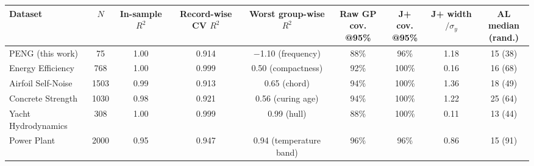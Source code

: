 \footnotesize\setlength{\tabcolsep}{2.5pt}%
\begin{tabular}{@{}lcccccccc@{}}
\toprule
Dataset & $N$ & \shortstack{In-sample\\$R^2$} & \shortstack{Record-wise\\CV $R^2$} & \shortstack{Worst group-wise\\$R^2$} & \shortstack{Raw GP cov.\\@95\%} & \shortstack{J+ cov.\\@95\%} & \shortstack{J+ width\\$/\sigma_y$} & \shortstack{AL median\\(rand.)} \\
\midrule
PENG (this work) & 75 & 1.00 & 0.914 & $-$1.10 (frequency) & 88\% & 96\% & 1.18 & 15 (38) \\
Energy Efficiency \cite{tsanasAccurateQuantitativeEstimation2012} & 768 & 1.00 & 0.999 & 0.50 (compactness) & 92\% & 100\% & 0.16 & 16 (68) \\
Airfoil Self-Noise \cite{brooksAirfoilSelfnoisePrediction1989} & 1503 & 0.99 & 0.913 & 0.65 (chord) & 94\% & 100\% & 1.36 & 18 (49) \\
Concrete Strength \cite{yehModelingStrengthHigh1998} & 1030 & 0.98 & 0.921 & 0.56 (curing age) & 94\% & 100\% & 1.22 & 25 (64) \\
Yacht Hydrodynamics \cite{gerritsmaGeometryResistanceStability1981} & 308 & 1.00 & 0.999 & 0.99 (hull) & 88\% & 100\% & 0.11 & 13 (44) \\
Power Plant \cite{tufekciPredictionFullLoad2014} & 2000 & 0.95 & 0.947 & 0.94 (temperature band) & 96\% & 96\% & 0.86 & 15 (91) \\
\bottomrule
\end{tabular}
